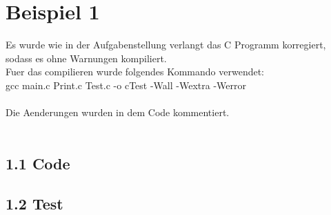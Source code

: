 \documentclass{report}
\newcommand{\name}{Marco Söllinger}
\newcommand{\matnr}{s2410306011}
\newcommand{\uebungsgruppe}{Gruppe 1}
\newcommand{\aufwand}{4}
\begin{document}

%

\section*{Beispiel 1}
Es wurde wie in der Aufgabenstellung verlangt das C Programm korregiert, sodass es ohne Warnungen kompiliert.\\
Fuer das compilieren wurde folgendes Kommando verwendet:\\
gcc main.c Print.c Test.c -o cTest -Wall -Wextra -Werror\\\\
Die Aenderungen wurden in dem Code kommentiert.\\\\

\subsection*{1.1 Code}







\subsection*{1.2 Test}
\end{document}
